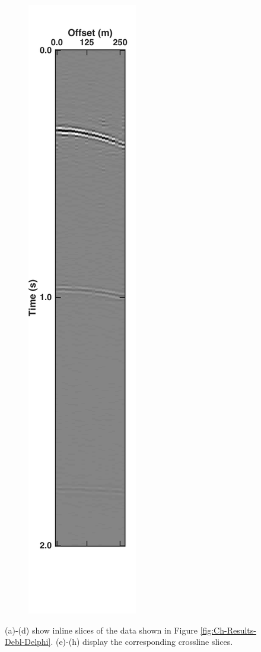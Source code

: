 \begin{figure}
\begin{subfigure}[t]{0.24\textwidth}
		\caption{}
		\label{fig:Ch-Results-Debl-xline10-t}
	\end{subfigure}
	\centering
	\begin{subfigure}[t]{0.24\textwidth}
		\centering
		\includegraphics[height = 0.38\textheight]{Plots/BlendingPatterns/Deblended_xline10xt}
		\caption{}
		\label{fig:Ch-Results-Debl-xline10-xt}
	\end{subfigure}
	
	\caption{(a)-(d) show inline slices of the data shown in Figure \ref{fig:Ch-Results-Debl-Delphi}. (e)-(h) display the corresponding crossline slices. }
	\label{fig:Ch-Results-Debl-x-inline}

\end{figure}

